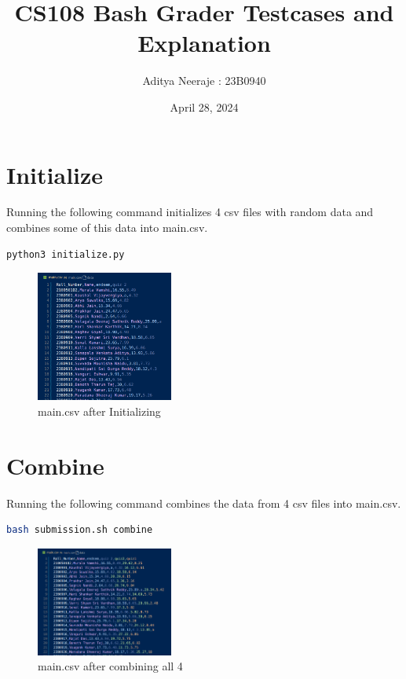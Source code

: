 \documentclass{article}
\title{CS108 Bash Grader Testcases and Explanation}
\author{Aditya Neeraje : 23B0940}
\date{April 28, 2024}
\begin{document}
    \maketitle
    \clearpage
    \section{Initialize}
    Running the following command initializes 4 csv files with random data and combines some of this data into main.csv.
    \begin{lstlisting}[language=bash]
        python3 initialize.py
    \end{lstlisting}
    \begin{figure}[htbp]
        \centering
        \includegraphics[width=0.4\textwidth]{Initialize}
        \caption{main.csv after Initializing}
        \label{fig:initialize}
    \end{figure}

    \section{Combine}
    Running the following command combines the data from 4 csv files into main.csv.
    \begin{lstlisting}[language=bash]
        bash submission.sh combine
    \end{lstlisting}
    \begin{figure}[htbp]
        \centering
        \includegraphics[width=0.4\textwidth]{Combine_all}
        \caption{main.csv after combining all 4}
        \label{fig:combine_all}
    \end{figure}
\end{document}
